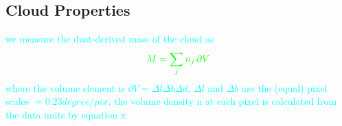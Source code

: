 \documentclass[twocolumn]{aastex631}
\begin{document}
{%



\subsection{Cloud Properties}\label{sec:properties}
\textcolor{cyan}{we measure the dust-derived mass of the cloud as 
\begin{align}\label{eq:mass}
\textcolor{green}{M = \sum_j n_{j}\, \partial V}
\end{align}
where the volume element is $\partial V = \Delta l \Delta b \Delta d$,  $\Delta l$ and $\Delta b$ are the (equal)
pixel scales $ = 0.23 degree / pix$. the volume density n at each pixel is calculated from the data units by equation x }

}
\end{document}
